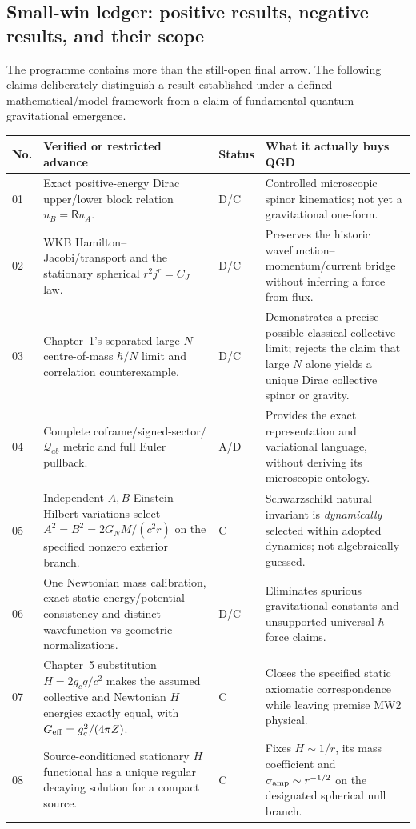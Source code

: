 \documentclass[11pt,a4paper]{article}
\begin{document}
\subsection{Small-win ledger: positive results, negative results, and their scope}\label{sec:v08-ledger}
The programme contains more than the still-open final arrow. The following claims deliberately distinguish a result established under a defined mathematical/model framework from a claim of fundamental quantum-gravitational emergence.
\begin{longtable}{@{}p{.075\linewidth}p{.36\linewidth}p{.075\linewidth}p{.38\linewidth}@{}}
\toprule
No.&Verified or restricted advance&Status&What it actually buys QGD\\\midrule\endhead
01&Exact positive-energy Dirac upper/lower block relation $u_B=\mathsf R u_A$.&D/C&Controlled microscopic spinor kinematics; not yet a gravitational one-form.\\
02&WKB Hamilton--Jacobi/transport and the stationary spherical $r^2j^r=C_J$ law.&D/C&Preserves the historic wavefunction--momentum/current bridge without inferring a force from flux.\\
03&Chapter~1's separated large-$N$ centre-of-mass $\hbar/N$ limit and correlation counterexample.&D/C&Demonstrates a precise possible classical collective limit; rejects the claim that large $N$ alone yields a unique Dirac collective spinor or gravity.\\
04&Complete coframe/signed-sector/$\mathcal Q_{ab}$ metric and full Euler pullback.&A/D&Provides the exact representation and variational language, without deriving its microscopic ontology.\\
05&Independent $A,B$ Einstein--Hilbert variations select $A^2=B^2=2G_NM/(c^2r)$ on the specified nonzero exterior branch.&C&Schwarzschild natural invariant is \emph{dynamically} selected within adopted dynamics; not algebraically guessed.\\
06&One Newtonian mass calibration, exact static energy/potential consistency and distinct wavefunction vs geometric normalizations.&D/C&Eliminates spurious gravitational constants and unsupported universal $\hbar$-force claims.\\
07&Chapter~5 substitution $H=2g_cq/c^2$ makes the assumed collective and Newtonian $H$ energies exactly equal, with $G_{\rm eff}=g_c^2/(4\pi Z)$.&C&Closes the specified static axiomatic correspondence while leaving premise MW2 physical.\\
08&Source-conditioned stationary $H$ functional has a unique regular decaying solution for a compact source.&C&Fixes $H\sim1/r$, its mass coefficient and $\sigma_{\rm amp}\sim r^{-1/2}$ on the designated spherical null branch.\\

\end{longtable}
\end{document}
